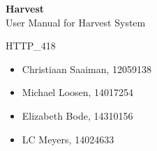 \documentclass[11pt,fleqn]{book} %
\begin{document}

\begingroup
\thispagestyle{empty}
\centering
\vspace*{5cm}
\par\normalfont\fontsize{35}{35}\sffamily\selectfont
\textbf{Harvest}\\
{\LARGE User Manual for Harvest System}\par %
\vspace*{0.5cm}
{\Huge HTTP\_418}\par
\centering
\vspace*{0.5cm}
\begin{itemize}[label={}, noitemsep]	
		\Large
		\item \begin{center} Christiaan Saaiman, 12059138 \end{center}
		\item \begin{center} Michael Loosen, 14017254 \end{center}
		\item \begin{center} Elizabeth Bode, 14310156 \end{center}
		\item \begin{center} LC Meyers, 14024633 \end{center}	
\end{itemize}
\endgroup



\pagestyle{empty} %

\tableofcontents %


\pagestyle{fancy} %

\end{document}
